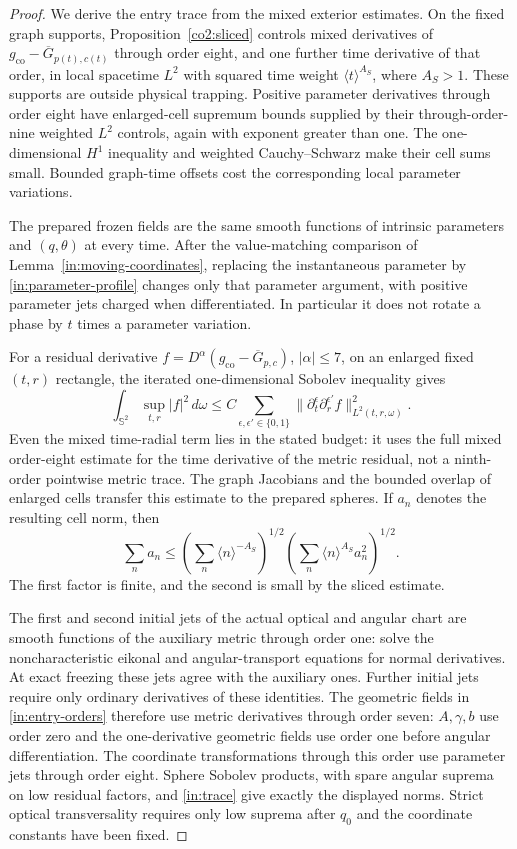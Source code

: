 \begin{proof}
We derive the entry trace from the mixed exterior estimates.
On the fixed graph supports, Proposition~\ref{co2:sliced} controls
mixed derivatives of
$g_{\mathrm{co}}-\overline G_{p(t),c(t)}$ through order eight,
and one further time derivative of that order, in local spacetime
$L^2$ with squared time weight $\langle t\rangle^{A_S}$,
where $A_S>1$. These supports are outside physical trapping.
Positive parameter derivatives through order eight have enlarged-cell
supremum bounds supplied by their through-order-nine weighted $L^2$
controls, again with exponent greater than one. The one-dimensional
$H^1$ inequality and weighted Cauchy--Schwarz make their cell sums
small. Bounded graph-time offsets cost the corresponding local
parameter variations.

The prepared frozen fields are the same smooth functions of intrinsic
parameters and $(q,\theta)$ at every time. After the value-matching
comparison of Lemma~\ref{in:moving-coordinates}, replacing the
instantaneous parameter by \eqref{in:parameter-profile} changes only
that parameter argument, with positive parameter jets charged when
differentiated. In particular it does not rotate a phase by
$t$ times a parameter variation.

For a residual derivative $f=D^{\alpha}
(g_{\mathrm{co}}-\overline G_{p,c})$, $|\alpha|\le7$, on an
enlarged fixed $(t,r)$ rectangle, the iterated one-dimensional Sobolev
inequality gives
\begin{equation}\label{in:trace}
 \int_{\mathbb S^2}\sup_{t,r}|f|^2\,d\omega
 \le C\sum_{\epsilon,\epsilon'\in\{0,1\}}
       \|\partial_t^\epsilon\partial_r^{\epsilon'}f
                    \|_{L^2(t,r,\omega)}^2.
\end{equation}
Even the mixed time-radial term lies in the stated budget: it uses
the full mixed order-eight estimate for the time derivative of the
metric residual, not a ninth-order pointwise metric trace.
The graph Jacobians and the bounded overlap of enlarged cells transfer
this estimate to the prepared spheres. If $a_n$ denotes the resulting
cell norm, then
\[
 \sum_n a_n
 \le\left(\sum_n\langle n\rangle^{-A_S}\right)^{1/2}
      \left(\sum_n\langle n\rangle^{A_S}a_n^2\right)^{1/2}.
\]
The first factor is finite, and the second is small by the sliced
estimate.

The first and second initial jets of the actual optical and angular
chart are smooth functions of the auxiliary metric through order one:
solve the noncharacteristic eikonal and angular-transport equations
for normal derivatives. At exact freezing these jets agree with the
auxiliary ones. Further initial jets require only ordinary
derivatives of these identities. The geometric fields in
\eqref{in:entry-orders} therefore use metric derivatives through
order seven: $A,\gamma,b$ use order zero and the one-derivative
geometric fields use order one before angular differentiation.
The coordinate transformations through this order use parameter jets
through order eight. Sphere Sobolev products, with spare angular
suprema on low residual factors, and \eqref{in:trace} give exactly
the displayed norms. Strict optical transversality requires only low
suprema after $q_0$ and the coordinate constants have been fixed.


\end{proof}
